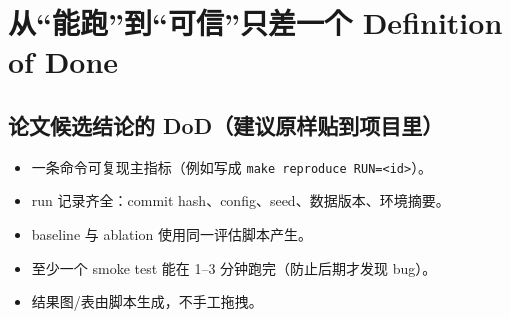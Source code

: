 \chapter{从“能跑”到“可信”只差一个 Definition of Done}
\label{ch:dod}
\section{论文候选结论的 DoD（建议原样贴到项目里）}
\begin{itemize}
  \item 一条命令可复现主指标（例如写成 \texttt{make reproduce RUN=<id>}）。
  \item run 记录齐全：commit hash、config、seed、数据版本、环境摘要。
  \item baseline 与 ablation 使用同一评估脚本产生。
  \item 至少一个 smoke test 能在 1--3 分钟跑完（防止后期才发现 bug）。
  \item 结果图/表由脚本生成，不手工拖拽。
\end{itemize}